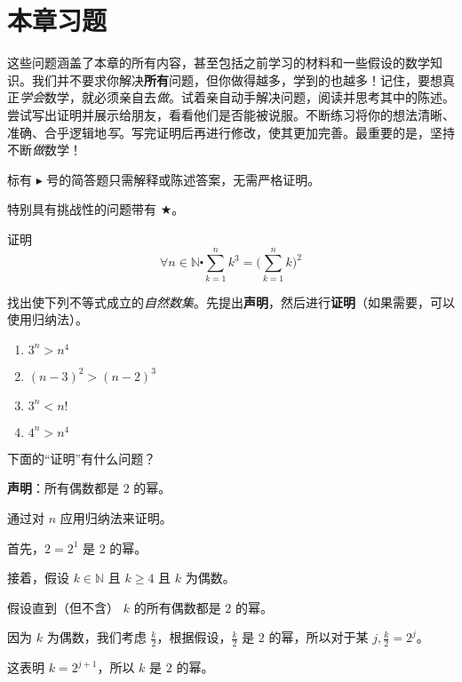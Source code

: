 \section{本章习题} \label{sec:section5.7}

这些问题涵盖了本章的所有内容，甚至包括之前学习的材料和一些假设的数学知识。我们并不要求你解决\textbf{所有}问题，但你做得越多，学到的也越多！记住，要想真正\emph{学会}数学，就必须亲自去\emph{做}。试着亲自动手解决问题，阅读并思考其中的陈述。尝试写出证明并展示给朋友，看看他们是否能被说服。不断练习将你的想法清晰、准确、合乎逻辑地\emph{写}。写完证明后再进行修改，使其更加完善。最重要的是，坚持不断\emph{做}数学！

标有 $\blacktriangleright$ 号的简答题只需解释或陈述答案，无需严格证明。

特别具有挑战性的问题带有 $\bigstar$。

\begin{exercise} \label{exc:exercises5.7.1}
    证明
    \[\forall n \in \mathbb{N} \centerdot \sum_{k=1}^{n} k^3 = \bigg(\sum_{k=1}^{n} k\bigg)^2\]
\end{exercise}

\begin{exercise}
    找出使下列不等式成立的\emph{自然数集}。先提出\textbf{声明}，然后进行\textbf{证明}（如果需要，可以使用归纳法）。
    \begin{enumerate}[label=(\alph*)]
        \item $3^n > n^4$
        \item $(n-3)^2 > (n-2)^3$
        \item $3^n < n!$
        \item $4^n > n^4$
    \end{enumerate}
\end{exercise}

\begin{exercise}
    下面的``证明''有什么问题？

    \textbf{声明}：所有偶数都是 $2$ 的幂。

    \begin{center}
        \noindent
            \parbox{0.85\textwidth}{%
                \linespread{1.5}\selectfont
                通过对 $n$ 应用归纳法来证明。

                首先，$2=2^1$ 是 $2$ 的幂。

                接着，假设 $k \in \mathbb{N}$ 且 $k \ge 4$ 且 $k$ 为偶数。
                
                假设直到（但不含） $k$ 的所有偶数都是 $2$ 的幂。

                因为 $k$ 为偶数，我们考虑 $\frac{k}{2}$，根据假设，$\frac{k}{2}$ 是 $2$ 的幂，所以对于某 $j, \frac{k}{2}=2^j$。

                这表明 $k = 2^{j+1}$，所以 $k$ 是 $2$ 的幂。 
            }
    \end{center}
\end{exercise}


